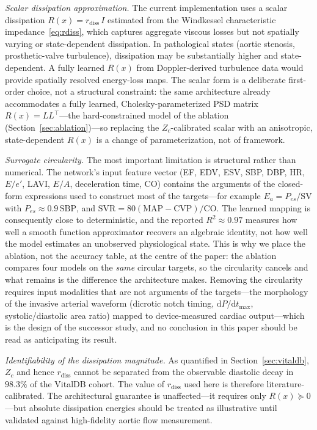 \documentclass[journal]{IEEEtran}
\begin{document}
\emph{Scalar dissipation approximation.} The current implementation uses a scalar dissipation $R(x)=r_{\text{diss}}\,I$ estimated from the Windkessel characteristic impedance~\eqref{eq:rdiss}, which captures aggregate viscous losses but not spatially varying or state-dependent dissipation. In pathological states (aortic stenosis, prosthetic-valve turbulence), dissipation may be substantially higher and state-dependent. A fully learned $R(x)$ from Doppler-derived turbulence data would provide spatially resolved energy-loss maps. The scalar form is a deliberate first-order choice, not a structural constraint: the same architecture already accommodates a fully learned, Cholesky-parameterized PSD matrix $R(x)=LL^{\top}$---the hard-constrained model of the ablation (Section~\ref{sec:ablation})---so replacing the $Z_c$-calibrated scalar with an anisotropic, state-dependent $R(x)$ is a change of parameterization, not of framework.

\emph{Surrogate circularity.} The most important limitation is structural rather than numerical. The network's input feature vector (EF, EDV, ESV, SBP, DBP, HR, $E/e'$, LAVI, $E/A$, deceleration time, CO) contains the arguments of the closed-form expressions used to construct most of the targets---for example $E_a=P_{es}/\text{SV}$ with $P_{es}\approx0.9\,\text{SBP}$, and $\text{SVR}=80(\text{MAP}-\text{CVP})/\text{CO}$. The learned mapping is consequently close to deterministic, and the reported $R^2\approx0.97$ measures how well a smooth function approximator recovers an algebraic identity, not how well the model estimates an unobserved physiological state. This is why we place the ablation, not the accuracy table, at the centre of the paper: the ablation compares four models on the \emph{same} circular targets, so the circularity cancels and what remains is the difference the architecture makes. Removing the circularity requires input modalities that are not arguments of the targets---the morphology of the invasive arterial waveform (dicrotic notch timing, $\mathrm{d}P/\mathrm{d}t_{\max}$, systolic/diastolic area ratio) mapped to device-measured cardiac output---which is the design of the successor study, and no conclusion in this paper should be read as anticipating its result.

\emph{Identifiability of the dissipation magnitude.} As quantified in Section~\ref{sec:vitaldb}, $Z_c$ and hence $r_{\text{diss}}$ cannot be separated from the observable diastolic decay in $98.3\%$ of the VitalDB cohort. The value of $r_{\text{diss}}$ used here is therefore literature-calibrated. The architectural guarantee is unaffected---it requires only $R(x)\succeq0$---but absolute dissipation energies should be treated as illustrative until validated against high-fidelity aortic flow measurement.
\end{document}
